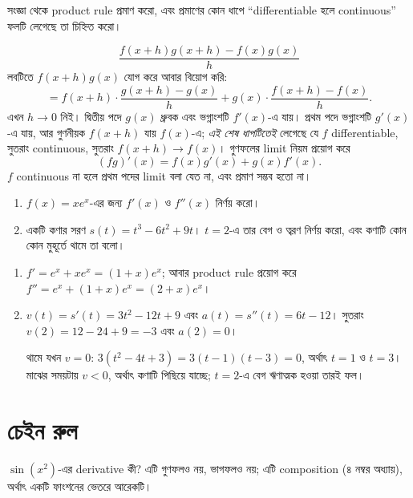 \documentclass[11pt]{article}
\begin{document}
 সংজ্ঞা থেকে product rule প্রমাণ করো, এবং প্রমাণের কোন ধাপে
``differentiable হলে continuous'' ফলটি লেগেছে তা চিহ্নিত করো।

\begin{sol}
\[
  \frac{f(x+h)g(x+h) - f(x)g(x)}{h}
\]
লবটিতে $f(x+h)g(x)$ যোগ করে আবার বিয়োগ করি:
\[
  = f(x+h)\cdot\frac{g(x+h)-g(x)}{h} + g(x)\cdot\frac{f(x+h)-f(x)}{h} .
\]
এখন $h \to 0$ নিই। দ্বিতীয় পদে $g(x)$ ধ্রুবক এবং ভগ্নাংশটি $f'(x)$-এ যায়।
প্রথম পদে ভগ্নাংশটি $g'(x)$-এ যায়, আর গুণনীয়ক $f(x+h)$ যায় $f(x)$-এ;
\emph{এই শেষ ধাপটিতেই} লেগেছে যে $f$ differentiable, সুতরাং continuous, সুতরাং
$f(x+h) \to f(x)$। গুণফলের limit নিয়ম প্রয়োগ করে
\[
  (fg)'(x) = f(x)g'(x) + g(x)f'(x) .
\]
$f$ continuous না হলে প্রথম পদের limit বলা যেত না, এবং প্রমাণ সম্ভব হতো না।
\end{sol}

\newpage

 \begin{enumerate}
  \item $f(x) = xe^{x}$-এর জন্য $f'(x)$ ও $f''(x)$ নির্ণয় করো।
  \item একটি কণার সরণ $s(t) = t^{3} - 6t^{2} + 9t$। $t = 2$-এ তার বেগ ও ত্বরণ
        নির্ণয় করো, এবং কণাটি কোন কোন মুহূর্তে থামে তা বলো।
\end{enumerate}

\begin{sol}
\begin{enumerate}
  \item $f' = e^{x} + xe^{x} = (1+x)e^{x}$; আবার product rule প্রয়োগ করে
        $f'' = e^{x} + (1+x)e^{x} = (2+x)e^{x}$।
  \item $v(t) = s'(t) = 3t^{2} - 12t + 9$ এবং $a(t) = s''(t) = 6t - 12$।
        সুতরাং $v(2) = 12 - 24 + 9 = -3$ এবং $a(2) = 0$।

        থামে যখন $v = 0$: $3\left( t^{2}-4t+3 \right) = 3(t-1)(t-3) = 0$,
        অর্থাৎ $t = 1$ ও $t = 3$। মাঝের সময়টায় $v < 0$, অর্থাৎ কণাটি পিছিয়ে
        যাচ্ছে; $t = 2$-এ বেগ ঋণাত্মক হওয়া তারই ফল।
\end{enumerate}
\end{sol}

\section{চেইন রুল}

$\sin\left( x^{2} \right)$-এর derivative কী? এটি গুণফলও নয়, ভাগফলও নয়; এটি
composition (৪ নম্বর অধ্যায়), অর্থাৎ একটি ফাংশনের ভেতরে আরেকটি।
\end{document}
